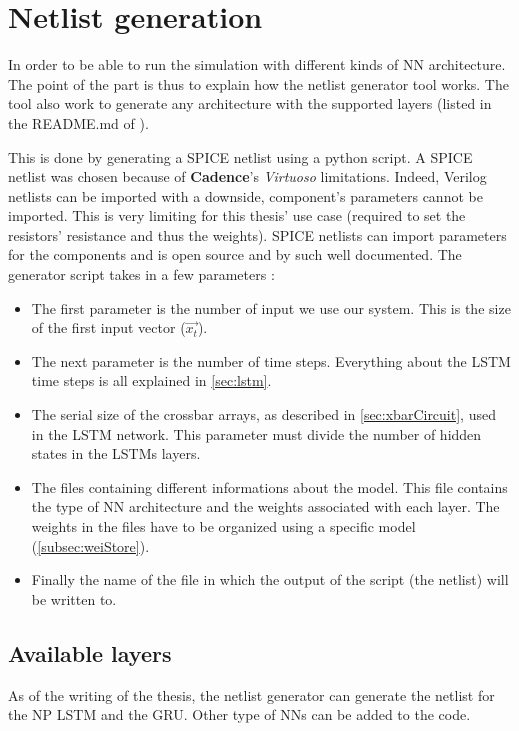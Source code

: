 \section{Netlist generation}
\label{sec:netlist}

In order to be able to run the simulation with different kinds of \ac{NN} architecture. The point of the part is thus to explain how the netlist generator tool works. The tool also work to generate any architecture with the supported layers (listed in the README.md of \cite{lstmGen}).

This is done by generating a SPICE netlist using a python script. A SPICE netlist was chosen because of \textbf{Cadence}'s \textit{Virtuoso} limitations. Indeed, Verilog netlists can be imported with a downside, component's parameters cannot be imported. This is very limiting for this thesis' use case (required to set the resistors' resistance and thus the weights). SPICE netlists can import parameters for the components and is open source and by such well documented. The generator script takes in a few parameters :

\begin{itemize}
  \item The first parameter is the number of input we use our system. This is the size of the first input vector ($\overrightarrow{x_t}$).
  \item The next parameter is the number of time steps. Everything about the \ac{LSTM} time steps is all explained in \cref{sec:lstm}.
  \item The serial size of the crossbar arrays, as described in \cref{sec:xbarCircuit}, used in the \ac{LSTM} network. This parameter must divide the number of hidden states in the \acp{LSTM} layers.
  \item The files containing different informations about the model. This file contains the type of \ac{NN} architecture and the weights associated with each layer. The weights in the files have to be organized using a specific model (\cref{subsec:weiStore}).
  \item Finally the name of the file in which the output of the script (the netlist) will be written to.
\end{itemize}

\subsection{Available layers}

As of the writing of the thesis, the netlist generator can generate the netlist for the \ac{NP} \ac{LSTM} and the \ac{GRU}. Other type of \acp{NN} can be added to the code.

